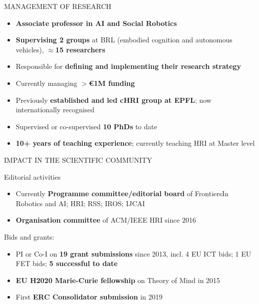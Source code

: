 \documentclass[xcolor=table]{beamer}
\begin{document}
\begin{frame}{MANAGEMENT OF RESEARCH}
    \begin{itemize}
        \item \textbf{Associate professor in AI and Social Robotics}
        \item \textbf{Supervising 2 groups} at BRL (embodied cognition and autonomous
            vehicles), $\approx$\textbf{15 researchers}
        \item Responsible for \textbf{defining and implementing their research strategy}
        \item Currently managing \textbf{$>$€1M funding}
        \item Previously \textbf{established and led cHRI group at EPFL}; now
            internationally recognised
        \item Supervised or co-supervised \textbf{10 PhDs} to date
        \item \textbf{10+ years of teaching experience}; currently teaching HRI at Master
            level
    \end{itemize}

\end{frame}

\begin{frame}{IMPACT IN THE SCIENTIFIC COMMUNITY}

    Editorial activities

    \begin{itemize}
        \item Currently \textbf{Programme committee/editorial board} of FrontiersIn Robotics and
            AI; HRI; RSS; IROS; IJCAI
        \item \textbf{Organisation committee} of ACM/IEEE HRI since 2016
    \end{itemize}

    Bids and grants:
    \begin{itemize}
        \item PI or Co-I on \textbf{19 grant submissions} since 2013, incl. 4 EU ICT bids; 1
            EU FET bids; \textbf{5 successful to date}
        \item \textbf{EU H2020 Marie-Curie fellowship} on Theory of Mind in 2015
        \item First \textbf{ERC Consolidator submission} in 2019
    \end{itemize}


\end{frame}
\end{document}
